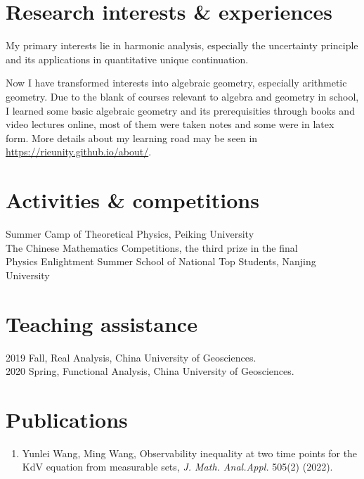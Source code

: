 \documentclass[11pt]{article} %
\begin{document}

\section*{Research interests \& experiences}
My primary interests lie in harmonic analysis, especially the uncertainty principle and its applications in quantitative unique continuation. 

Now I have transformed interests into algebraic geometry, especially arithmetic geometry. Due to the blank of courses relevant to algebra and geometry in school, I learned some basic algebraic geometry and its prerequisities through books and video lectures online, most of them were taken notes and some were in latex form. More details about my learning road may be seen in \url{https://rieunity.github.io/about/}.

\section*{Activities \& competitions}
 Summer Camp of Theoretical Physics, Peiking University\\
 The Chinese Mathematics Competitions, the third prize  in the final\\
 Physics Enlightment Summer School of National Top Students, Nanjing University


\section*{Teaching assistance}
2019 Fall, Real Analysis, China University of Geosciences. \\
2020 Spring, Functional Analysis, China University of Geosciences.

\section*{Publications}
\begin{enumerate}
\leftskip-0.13in
\item Yunlei Wang, Ming Wang, Observability inequality at two time points for the KdV equation from measurable sets, \emph{J. Math. Anal.Appl.} 505(2) (2022).
\end{enumerate}
\iffalse
\end{document}
